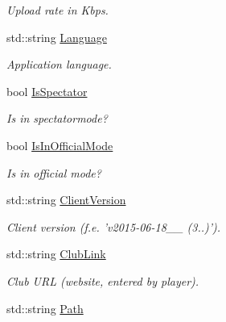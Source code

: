 \begin{DoxyCompactItemize}
\begin{DoxyCompactList}\small\item\em Upload rate in Kbps. \end{DoxyCompactList}\item 
\hypertarget{structPlayer_a583abe4cc5985fc83bfed62362efa358}{std\-::string \hyperlink{structPlayer_a583abe4cc5985fc83bfed62362efa358}{Language}}\label{structPlayer_a583abe4cc5985fc83bfed62362efa358}

\begin{DoxyCompactList}\small\item\em Application language. \end{DoxyCompactList}\item 
\hypertarget{structPlayer_a61ba0e32d336f5cd1eb152addf6848d2}{bool \hyperlink{structPlayer_a61ba0e32d336f5cd1eb152addf6848d2}{Is\-Spectator}}\label{structPlayer_a61ba0e32d336f5cd1eb152addf6848d2}

\begin{DoxyCompactList}\small\item\em Is in spectatormode? \end{DoxyCompactList}\item 
\hypertarget{structPlayer_a76e8b5298bcbe9ff694b6ed490ef7ca5}{bool \hyperlink{structPlayer_a76e8b5298bcbe9ff694b6ed490ef7ca5}{Is\-In\-Official\-Mode}}\label{structPlayer_a76e8b5298bcbe9ff694b6ed490ef7ca5}

\begin{DoxyCompactList}\small\item\em Is in official mode? \end{DoxyCompactList}\item 
\hypertarget{structPlayer_ae275137c2fe689552ebde4d3b1e5f4ff}{std\-::string \hyperlink{structPlayer_ae275137c2fe689552ebde4d3b1e5f4ff}{Client\-Version}}\label{structPlayer_ae275137c2fe689552ebde4d3b1e5f4ff}

\begin{DoxyCompactList}\small\item\em Client version (f.\-e. 'v2015-\/06-\/18\-\_\-\_ (3..)'). \end{DoxyCompactList}\item 
\hypertarget{structPlayer_af6acb51bf731275d73aa6cc55a8255a8}{std\-::string \hyperlink{structPlayer_af6acb51bf731275d73aa6cc55a8255a8}{Club\-Link}}\label{structPlayer_af6acb51bf731275d73aa6cc55a8255a8}

\begin{DoxyCompactList}\small\item\em Club U\-R\-L (website, entered by player). \end{DoxyCompactList}\item 
\hypertarget{structPlayer_a3da038886ddd825ebc9612b460ecd008}{std\-::string \hyperlink{structPlayer_a3da038886ddd825ebc9612b460ecd008}{Path}}\label{structPlayer_a3da038886ddd825ebc9612b460ecd008}


\end{DoxyCompactItemize}
